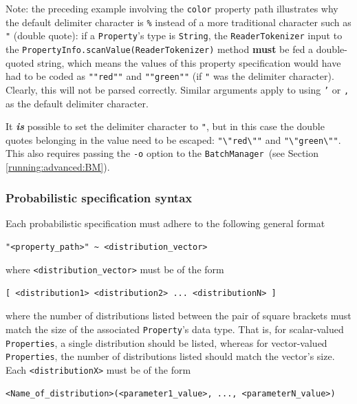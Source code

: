 \documentclass{article}
\newcommand{\BM}{{\tt BatchManager}}
\begin{document}
\begin{sideblock}
Note: the preceding example involving the {\tt color} property path illustrates why the default delimiter character is {\tt \%} instead of a more traditional character such as {\tt "} (double quote): if a {\tt Property}'s type is {\tt String}, the {\tt ReaderTokenizer} input to the {\tt PropertyInfo.scanValue(ReaderTokenizer)} method \textbf{must} be fed a double-quoted string, which means the values of this property specification would have had to be coded as {\tt ""red""} and {\tt ""green""} (if {\tt "} was the delimiter character). Clearly, this will not be parsed correctly. Similar arguments apply to using {\tt '} or {\tt ,} as the default delimiter character.

It \textbf{\textit{is}} possible to set the delimiter character to {\tt "}, but in this case the double quotes belonging in the value need to be escaped: {\tt "\textbackslash"red\textbackslash""} and {\tt "\textbackslash"green\textbackslash""}. This also requires passing the {\tt -o} option to the \BM\ (see Section \ref{running:advanced:BM}).
\end{sideblock}

\subsubsection{Probabilistic specification syntax}
\label{psl:prop-spec:prob-spec}

Each probabilistic specification must adhere to the following general format

\begin{lstlisting}[]
   "<property_path>" ~ <distribution_vector>
\end{lstlisting}

where {\tt <distribution\_vector>} must be of the form

\begin{lstlisting}[]
   [ <distribution1> <distribution2> ... <distributionN> ]
\end{lstlisting}

where the number of distributions listed between the pair of square brackets must match the size of the associated {\tt Property}'s data type. That is, for scalar-valued {\tt Properties}, a single distribution should be listed, whereas for vector-valued {\tt Properties}, the number of distributions listed should match the vector's size. Each {\tt <distributionX>} must be of the form

\begin{lstlisting}[]
  <Name_of_distribution>(<parameter1_value>, ..., <parameterN_value>)
\end{lstlisting}
\end{document}

